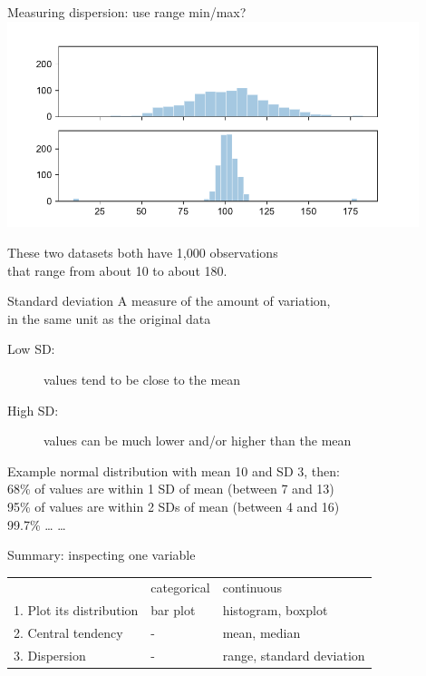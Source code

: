 \documentclass{beamer}
\begin{document}
\begin{frame}{Measuring dispersion: use range min/max?}
\includegraphics[width=0.9\textwidth]{fig/disp}

These two datasets both have 1,000 observations \\
that range from about 10 to about 180.
\end{frame}


\begin{frame}{Standard deviation}
A measure of the amount of variation,\\
in the same unit as the original data

\begin{description}
    \item[Low SD:] values tend to be close to the mean
    \item[High SD:] values can be much lower and/or higher than the mean
\end{description}

\begin{block}{Example}
normal distribution with mean 10 and SD 3, then:\\
68\% of values are within 1 SD of mean (between 7 and 13) \\
95\% of values are within 2 SDs of mean (between 4 and 16) \\
99.7\% \dots
\dots
\end{block}
\end{frame}



\begin{frame}{Summary: inspecting one variable}
\begin{tabular}{lll}     & categorical & continuous \\
1. Plot its distribution & bar plot    & histogram, boxplot \\
2. Central tendency      & -           & mean, median \\
3. Dispersion            & -           & range, standard deviation \\
\end{tabular}
\end{frame}
\end{document}
